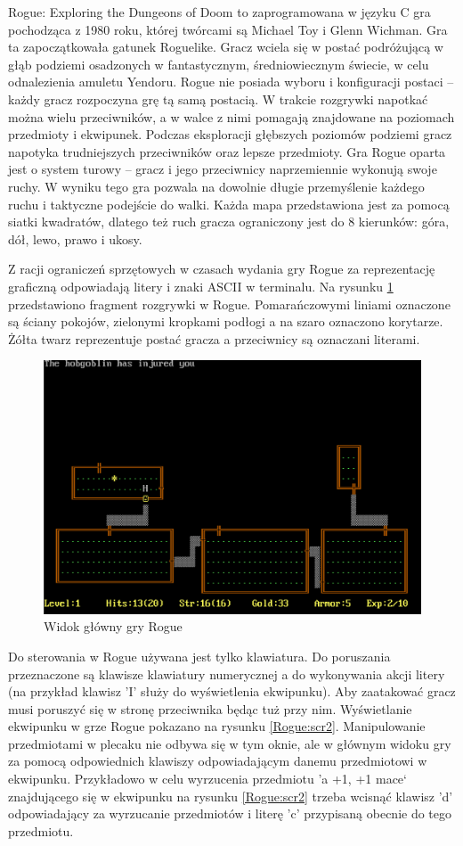 \documentclass[12pt,twoside]{article}
\begin{document}
Rogue: Exploring the Dungeons of Doom to zaprogramowana w języku C gra pochodząca z 1980 roku, której twórcami są Michael Toy i Glenn Wichman. Gra ta zapoczątkowała gatunek Roguelike. Gracz wciela się w postać podróżującą w głąb podziemi osadzonych w fantastycznym, średniowiecznym świecie, w celu odnalezienia amuletu Yendoru. Rogue nie posiada wyboru i konfiguracji postaci -- każdy gracz rozpoczyna grę tą samą postacią. W trakcie rozgrywki napotkać można wielu przeciwników, a w walce z nimi pomagają znajdowane na poziomach przedmioty i ekwipunek. Podczas eksploracji głębszych poziomów podziemi gracz napotyka trudniejszych przeciwników oraz lepsze przedmioty. Gra Rogue oparta jest o system turowy -- gracz i jego przeciwnicy naprzemiennie wykonują swoje ruchy. W wyniku tego gra pozwala na dowolnie długie przemyślenie każdego ruchu i taktyczne podejście do walki. Każda mapa przedstawiona jest za pomocą siatki kwadratów, dlatego też ruch gracza ograniczony jest do 8 kierunków: góra, dół, lewo, prawo i ukosy. 

Z racji ograniczeń sprzętowych w czasach wydania gry Rogue za reprezentację graficzną odpowiadają litery i znaki ASCII w terminalu. Na rysunku \ref{Rogue:scr1} przedstawiono fragment rozgrywki w Rogue. Pomarańczowymi liniami oznaczone są ściany pokojów, zielonymi kropkami podłogi a na szaro oznaczono korytarze. Żółta twarz reprezentuje postać gracza a przeciwnicy są oznaczani literami.

\FloatBarrier
\begin{figure}[ht]
	\centering
	\includegraphics[width=12cm]{images/rogue/scr1.png}
	\caption{Widok główny gry Rogue}
	\label{Rogue:scr1}
\end{figure}
\FloatBarrier

Do sterowania w Rogue używana jest tylko klawiatura. Do poruszania przeznaczone są klawisze klawiatury numerycznej a do wykonywania akcji litery (na przykład klawisz 'I' służy do wyświetlenia ekwipunku). Aby zaatakować gracz musi poruszyć się w stronę przeciwnika będąc tuż przy nim. Wyświetlanie ekwipunku w grze Rogue pokazano na rysunku \ref{Rogue:scr2}. Manipulowanie przedmiotami w plecaku nie odbywa się w tym oknie, ale w głównym widoku gry za pomocą odpowiednich klawiszy odpowiadającym danemu przedmiotowi w ekwipunku. Przykładowo w celu wyrzucenia przedmiotu 'a +1, +1 mace` znajdującego się w ekwipunku na rysunku \ref{Rogue:scr2} trzeba wcisnąć klawisz 'd' odpowiadający za wyrzucanie przedmiotów i literę 'c' przypisaną obecnie do tego przedmiotu. 
\end{document}
